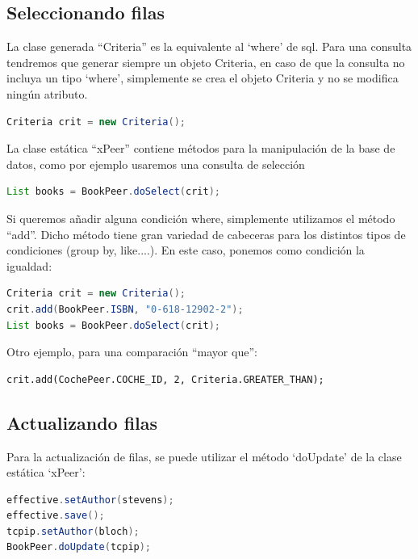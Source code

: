 \documentclass[12pt, oneside]{article}
\begin{document}
\subsection{Seleccionando filas}
La clase generada “Criteria” es la equivalente al ‘where’ de sql. Para una consulta tendremos que generar siempre un objeto Criteria, en caso de que la consulta no incluya un tipo ‘where’, simplemente se crea el objeto Criteria y no se modifica ningún atributo.

\begin{lstlisting}[language=Java]
Criteria crit = new Criteria();
\end{lstlisting}

La clase estática “xPeer” contiene métodos para la manipulación de la base de datos, como por ejemplo usaremos una consulta de selección

\begin{lstlisting}[language=Java]
List books = BookPeer.doSelect(crit);
\end{lstlisting}

Si queremos añadir alguna condición where, simplemente utilizamos el método “add”. Dicho método tiene gran variedad de cabeceras para los distintos tipos de condiciones (group by, like....). En este caso, ponemos como condición la igualdad:

\begin{lstlisting}[language=Java]
Criteria crit = new Criteria();
crit.add(BookPeer.ISBN, "0-618-12902-2");
List books = BookPeer.doSelect(crit);
\end{lstlisting}

Otro ejemplo, para una comparación “mayor que”:

\begin{lstlisting}
crit.add(CochePeer.COCHE_ID, 2, Criteria.GREATER_THAN);
\end{lstlisting}

\subsection{Actualizando filas} 

Para la actualización de filas, se puede utilizar el método ‘doUpdate’ de la clase estática ‘xPeer’:

\begin{lstlisting}[language=Java]
effective.setAuthor(stevens);
effective.save();
tcpip.setAuthor(bloch);
BookPeer.doUpdate(tcpip);
\end{lstlisting}
\end{document}
